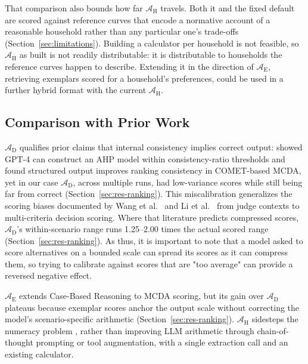 \documentclass[final,3p,times]{elsarticle}
\begin{document}
That comparison also bounds how far $\mathcal{A}_{\text{H}}$ travels. Both it and the fixed default are scored against reference curves that encode a normative account of a reasonable household rather than any particular one's trade-offs (Section~\ref{sec:limitations}). Building a calculator per household is not feasible, so $\mathcal{A}_{\text{H}}$ as built is not readily distributable: it is distributable to households the reference curves happen to describe. Extending it in the direction of $\mathcal{A}_{\text{E}}$, retrieving exemplars scored for a household's  preferences, could be used in a further hybrid format with the current $\mathcal{A}_{\text{H}}$.

\FloatBarrier
\subsection{Comparison with Prior Work}
\label{sec:comparison}

$\mathcal{A}_{\text{D}}$ qualifies prior claims that internal consistency implies correct output: \citet{svoboda2024} showed GPT-4 can construct an AHP model within consistency-ratio thresholds and \citet{icaart26} found structured output improves ranking consistency in COMET-based MCDA, yet in our case $\mathcal{A}_{\text{D}}$, across multiple runs, had low-variance scores while still being far from correct (Section~\ref{sec:res-ranking}). This miscalibration generalizes the scoring biases documented by Wang et al.~\cite{wang2024fairescalers} and Li et al.~\cite{li2026scoringbias} from judge contexts to multi-criteria decision scoring. Where that literature predicts compressed scores, $\mathcal{A}_{\text{D}}$'s within-scenario range runs 1.25--2.00 times the actual scored range (Section~\ref{sec:res-ranking}). As thus, it is important to note that a model asked to score alternatives on a bounded scale can spread its scores as it can compress them, so trying to calibrate against scores that are "too average" can provide a reversed negative effect.

$\mathcal{A}_{\text{E}}$ extends Case-Based Reasoning \cite{aamodtplaza1994,minorkaucher2024} to MCDA scoring, but its gain over $\mathcal{A}_{\text{D}}$ plateaus because exemplar scores anchor the output scale without correcting the model's scenario-specific arithmetic (Section~\ref{sec:res-ranking}). $\mathcal{A}_{\text{H}}$ sidesteps the numeracy problem \cite{imani2023mathprompter}, rather than improving LLM arithmetic through chain-of-thought prompting \cite{wei2022cot} or tool augmentation, with a single extraction call and an existing calculator. 
\end{document}
